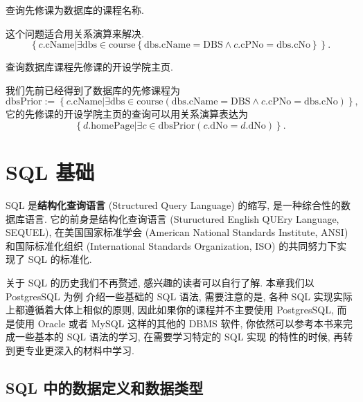 \documentclass[10pt,UTF8]{book} %
\begin{document}
\begin{example}
    查询先修课为数据库的课程名称.
    \begin{sol}
        这个问题适合用关系演算来解决.
        \[ \left\{
            c.\mathrm{cName} | 
            \exists \mathrm{dbs} \in \mathrm{course} \left\{
                \mathrm{dbs}.\mathrm{cName} = \mathrm{DBS}
                \wedge c.\mathrm{cPNo} = \mathrm{dbs}.\mathrm{cNo}
            \right\}
        \right\}. \]
    \end{sol}
\end{example}

\begin{example}
    查询数据库课程先修课的开设学院主页.
    \begin{sol}
        我们先前已经得到了数据库的先修课程为
        \[ \mathrm{dbsPrior} := 
        \left\{c.\mathrm{cName} | 
        \exists \mathrm{dbs} \in \mathrm{course} \left(
            \mathrm{dbs}.\mathrm{cName} = \mathrm{DBS}
            \wedge c.\mathrm{cPNo} = \mathrm{dbs}.\mathrm{cNo}
        \right)\right\}, \]
        它的先修课的开设学院主页的查询可以用关系演算表达为
        \[ \left\{ d.\mathrm{homePage} | 
        \exists c \in \mathrm{dbsPrior} \left(
            c.\mathrm{dNo} = d.\mathrm{dNo}
        \right) \right\}. \]
    \end{sol}
\end{example}

\newpage
\thispagestyle{empty}

\chapter{SQL 基础}

SQL 是\textbf{结构化查询语言} (Structured Query Language) 的缩写,
是一种综合性的数据库语言.
它的前身是结构化查询语言 (Stuructured English QUEry Language, SEQUEL),
在美国国家标准学会 (American National Standards Institute, ANSI) 和国际标准化组织
(International Standards Organization, ISO) 的共同努力下实现了 SQL 的标准化.

关于 SQL 的历史我们不再赘述, 感兴趣的读者可以自行了解. 本章我们以 PostgresSQL 为例
介绍一些基础的 SQL 语法, 需要注意的是, 各种 SQL 实现实际上都遵循着大体上相似的原则,
因此如果你的课程并不主要使用 PostgresSQL, 而是使用 Oracle 或者 MySQL 这样的其他的
DBMS 软件, 你依然可以参考本书来完成一些基本的 SQL 语法的学习, 在需要学习特定的 SQL 实现
的特性的时候, 再转到更专业更深入的材料中学习.

\section{SQL 中的数据定义和数据类型}
\end{document}
